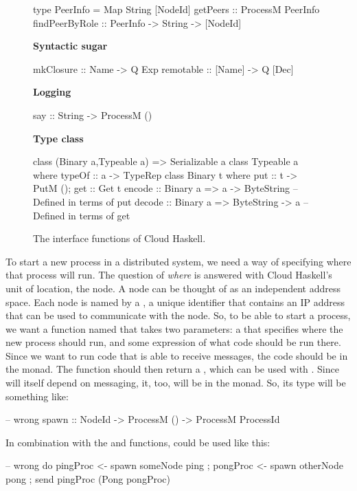 \documentclass[preprint]{sigplanconf}
\begin{document}
\begin{figure}[t!]
\begin{code}
type PeerInfo = Map String [NodeId]
getPeers       :: ProcessM PeerInfo
findPeerByRole :: PeerInfo -> String -> [NodeId]
\end{code}

 \textbf{Syntactic sugar}
\begin{code}
mkClosure :: Name   -> Q Exp
remotable :: [Name] -> Q [Dec]
\end{code}

 \textbf{Logging}
\begin{code}
say :: String -> ProcessM ()
\end{code}

 \textbf{Type class}
\begin{code}
class (Binary a,Typeable a) => Serializable a
class Typeable a where typeOf :: a -> TypeRep
class Binary t where { put :: t -> PutM (); get :: Get t }
encode :: Binary a => a -> ByteString
  -- Defined in terms of put
decode :: Binary a => ByteString -> a
  -- Defined in terms of get
\end{code}
\caption{The interface functions of Cloud Haskell.%
\label{fig:api}}
\end{figure}


To start a new process in a distributed system, we need a way of specifying where that process will run. 
The question of {\em where} is answered with Cloud Haskell's unit of location, the node. 
A node can be thought of as an independent address space.
Each node is named by a , a unique identifier that contains an IP address that can be used to communicate with the node. 
So, to be able to start a process, we want a function named  that takes two parameters: 
a  that specifies where the new process should run, and some expression of what code should be run there. 
Since we want to run code that is able to receive messages, the code should be in the  monad. 
The  function should then return a , which can be used with .  
Since  will itself depend on messaging, it, too, will be in the  monad. 
So, its type will be something like:

\begin{code}
-- wrong
spawn :: NodeId -> ProcessM () -> ProcessM ProcessId
\end{code}

In combination with the  and  functions,  could be used like this:

\needspace{4ex}
\begin{code}
-- wrong
do { pingProc <- spawn someNode ping
   ; pongProc <- spawn otherNode pong
   ; send pingProc (Pong pongProc) }
\end{code}
\end{document}
